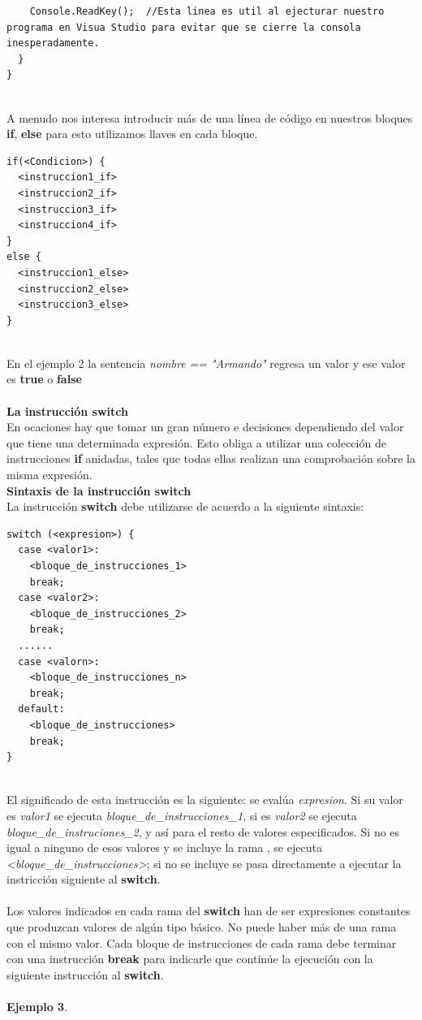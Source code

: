 \documentclass[12pt,a4paper]{report}
\begin{document}
{\begin{lstlisting}
    Console.ReadKey();  //Esta linea es util al ejecturar nuestro programa en Visua Studio para evitar que se cierre la consola inesperadamente.
  }
}
\end{lstlisting}
\\A menudo nos interesa introducir más de una línea de código en nuestros bloques \textbf{if}, \textbf{else} para esto utilizamos llaves {} en cada bloque.\\
\begin{lstlisting}
if(<Condicion>) {
  <instruccion1_if>
  <instruccion2_if>
  <instruccion3_if>
  <instruccion4_if>
}
else {
  <instruccion1_else>
  <instruccion2_else>
  <instruccion3_else>
}
\end{lstlisting}
\\En el ejemplo 2 la sentencia \textit{nombre == "Armando"} regresa un valor y ese valor es \textbf{true} o \textbf{false}\\\\\textbf{La instrucción switch}\\
En ocaciones hay que tomar un gran número e decisiones dependiendo del valor que tiene una determinada expresión. Esto obliga a utilizar una colección de instrucciones \textbf{if} anidadas, tales que todas ellas realizan una comprobación sobre la misma expresión.\\\textbf{Sintaxis de la instrucción switch}\\La instrucción \textbf{switch} debe utilizarse de acuerdo a la siguiente sintaxis:\\
\begin{lstlisting}
switch (<expresion>) {
  case <valor1>: 
    <bloque_de_instrucciones_1>
    break;
  case <valor2>: 
    <bloque_de_instrucciones_2>
    break;
  ......
  case <valorn>: 
    <bloque_de_instrucciones_n>
    break;
  default:
    <bloque_de_instrucciones>
    break;
}
\end{lstlisting}\\
El significado de esta instrucción es la siguiente: se evalúa \textit{expresion}. Si su valor es \textit{valor1} se ejecuta \textit{bloque_de_instrucciones_1}, si es \textit{valor2} se ejecuta \textit{bloque_de_instruciones_2}, y así para el resto de valores especificados. Si no es igual a ninguno de esos valores y se incluye la rama , se ejecuta \textit{<bloque_de_instrucciones>}; si no se incluye se pasa directamente a ejecutar la instricción siguiente al \textbf{switch}.\\\\Los valores indicados en cada rama del \textbf{switch} han de ser expresiones constantes que produzcan valores de algún tipo básico. No puede haber más de una rama con el mismo valor. Cada bloque de instrucciones de cada rama debe terminar con una instrucción \textbf{break} para indicarle que continúe la ejecución con la siguiente instrucción al \textbf{switch}.\\\\\textbf{Ejemplo 3}.\\

}
\end{document}
